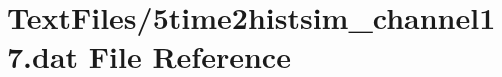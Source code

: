 \hypertarget{5time2histsim__channel17_8dat}{}\section{Text\+Files/5time2histsim\+\_\+channel17.dat File Reference}
\label{5time2histsim__channel17_8dat}
